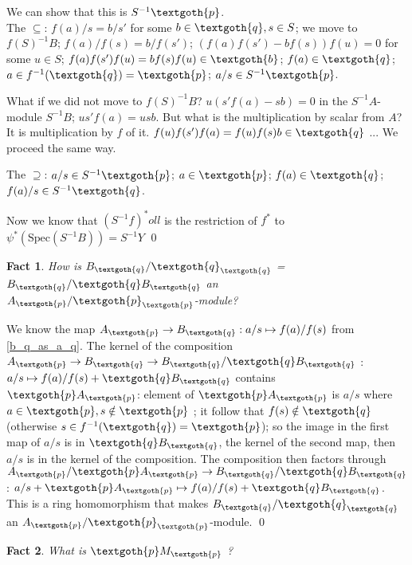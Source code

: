 \documentclass{article}
\newtheorem{theorem}{Fact}[section]
\begin{document}
We can show that this is $S^{-1}\textgoth{p}$. \\

The $\subseteq$: $f(a)/s = b/s'$ for some $b \in \textgoth{q}, s \in S$; we move to $f(S)^{-1}B$; $f(a)/f(s) = b/f(s')$; $(f(a)f(s') - bf(s))f(u) = 0$ for some $u \in S$; $f(a)f(s')f(u) = bf(s)f(u) \in \textgoth{b}$; $f(a) \in \textgoth{q}$; $a \in f^{-1}(\textgoth{q}) = \textgoth{p}$; $a/s \in S^{-1}\textgoth{p}$. 

What if we did not move to $f(S)^{-1}B$? $u(s'f(a) - sb) = 0$ in the $S^{-1}A$-module $S^{-1}B$; $us'f(a) = usb$. But what is the multiplication by scalar from $A$? It is multiplication by $f$ of it. $f(u)f(s')f(a) = f(u)f(s)b \in \textgoth{q}$ ... We proceed the same way.

The $\supseteq$: $a/s \in S^{-1}\textgoth{p}$; $a \in \textgoth{p}$; $f(a) \in \textgoth{q}$; $f(a)/s \in S^{-1}\textgoth{q}$.

Now we know that $(S^{-1}f)^*oll$ is the restriction of $f^*$ to $\psi^*(\textrm{Spec}(S^{-1}B)) = S^{-1}Y$
\qed

\bigskip
\begin{theorem}
How is $B_\textgoth{q} / \textgoth{q}_\textgoth{q}$ = $B_\textgoth{q}/\textgoth{q}B_\textgoth{q}$ an $A_\textgoth{p} / \textgoth{p}_\textgoth{p}$-module?
\end{theorem}

\noindent
We know the map $A_\textgoth{p} \rightarrow B_\textgoth{q} : a/s \mapsto f(a)/f(s)$ from \ref{b_q_as_a_q}.
The kernel of the composition $A_\textgoth{p} \rightarrow B_\textgoth{q} \rightarrow B_\textgoth{q} / \textgoth{q} B_\textgoth{q}$ : $a/s \mapsto f(a)/f(s) + \textgoth{q} B_\textgoth{q}$ contains $\textgoth{p} A_\textgoth{p}$: 
element of $\textgoth{p}A_\textgoth{p}$ is $a/s$ where $a \in \textgoth{p}, s \notin \textgoth{p}$ ; it follow that $f(s) \notin \textgoth{q}$ (otherwise $s \in f^{-1}(\textgoth{q}) = \textgoth{p}$); so the image in the first map of $a/s$ is in $\textgoth{q}B_\textgoth{q}$, the kernel of the second map, then $a/s$ is in the kernel of the composition.
The composition then factors through $A_\textgoth{p} / \textgoth{p} A_\textgoth{p} \rightarrow B_\textgoth{q} / \textgoth{q} B_\textgoth{q}$: $a/s + \textgoth{p} A_\textgoth{p} \mapsto f(a)/f(s) + \textgoth{q} B_\textgoth{q}$. This is a ring homomorphism that makes $B_\textgoth{q} / \textgoth{q}_\textgoth{q}$ an $A_\textgoth{p} / \textgoth{p}_\textgoth{p}$-module.
\qed

\begin{theorem}
What is $\textgoth{p} M_\textgoth{p}$ ?
\end{theorem}
\end{document}
